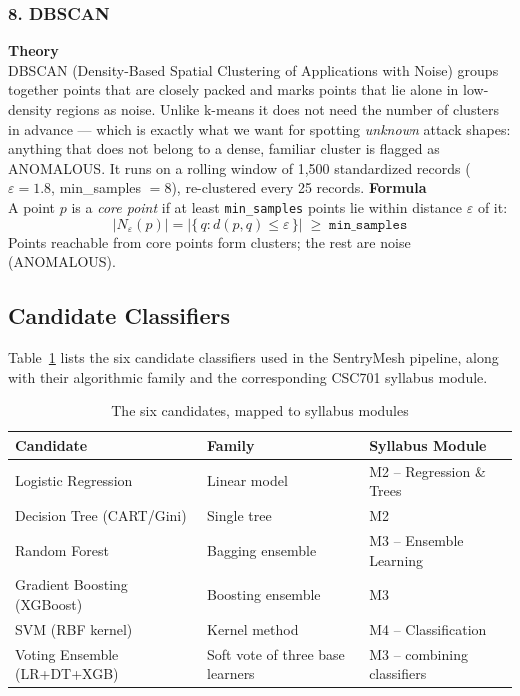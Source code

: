 \documentclass[12pt,a4paper]{article}
\begin{document}
\subsubsection*{8. DBSCAN}
\textbf{Theory}\\
DBSCAN (Density-Based Spatial Clustering of Applications with Noise) groups together
points that are closely packed and marks points that lie alone in low-density regions
as noise. Unlike k-means it does not need the number of clusters in advance --- which
is exactly what we want for spotting \emph{unknown} attack shapes: anything that does
not belong to a dense, familiar cluster is flagged as ANOMALOUS. It runs on a rolling
window of 1,500 standardized records ($\varepsilon = 1.8$, min\_samples $= 8$),
re-clustered every 25 records.
\textbf{Formula}\\
A point $p$ is a \emph{core point} if at least \texttt{min\_samples} points lie
within distance $\varepsilon$ of it:
\begin{equation}
  |N_\varepsilon(p)| = |\{\, q : d(p,q) \le \varepsilon \,\}| \;\ge\; \texttt{min\_samples}
\end{equation}
Points reachable from core points form clusters; the rest are noise (ANOMALOUS).

\subsection{Candidate Classifiers}
Table~\ref{tab:candidates} lists the six candidate classifiers used in the
SentryMesh pipeline, along with their algorithmic family and the corresponding
CSC701 syllabus module.

\begin{table}[H]
\caption{The six candidates, mapped to syllabus modules}
\label{tab:candidates}
\centering
\small
\begin{tabular}{p{3.8cm}p{4.4cm}p{4.4cm}}
\toprule
\textbf{Candidate} & \textbf{Family} & \textbf{Syllabus Module}\\
\midrule
Logistic Regression & Linear model & M2 -- Regression \& Trees\\
Decision Tree (CART/Gini) & Single tree & M2\\
Random Forest & Bagging ensemble & M3 -- Ensemble Learning\\
Gradient Boosting (XGBoost) & Boosting ensemble & M3\\
SVM (RBF kernel) & Kernel method & M4 -- Classification\\
Voting Ensemble (LR+DT+XGB) & Soft vote of three base learners & M3 -- combining classifiers\\
\bottomrule
\end{tabular}
\end{table}
\end{document}
